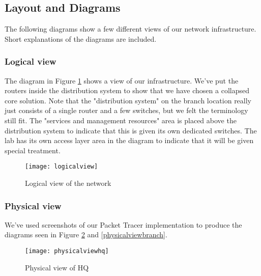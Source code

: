 


\subsection{Layout and Diagrams}

The following diagrams show a few different views of our network infrastructure. Short explanations of the diagrams are included.

\subsubsection{Logical view}


The diagram in Figure \ref{logicalview} shows a view of our infrastructure. We've put the routers inside the distribution system to show that we have chosen a collapsed core solution. Note that the "distribution system" on the branch location really just consists of a single router and a few switches, but we felt the terminology still fit. The "services and management resources" area is placed above the distribution system to indicate that this is given its own dedicated switches. The lab has its own access layer area in the diagram to indicate that it will be given special treatment.

\begin{figure}[H]
\caption{Logical view of the network}
\centering
\texttt{[image: logicalview]}
\label{logicalview}
\end{figure}

\subsubsection{Physical view}

We've used screenshots of our Packet Tracer implementation to produce the diagrams seen in Figure \ref{physicalviewhq} and \ref{physicalviewbranch}.


\begin{figure}[H]
\caption{Physical view of HQ}
\centering
\texttt{[image: physicalviewhq]}
\label{physicalviewhq}
\end{figure}

